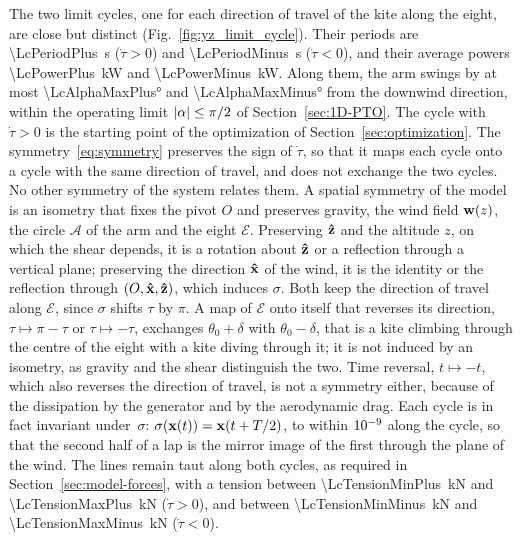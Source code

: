 The two limit cycles, one for each direction of travel of the kite along the eight, are close but distinct (Fig.~\ref{fig:yz_limit_cycle}).
Their periods are \SI{\LcPeriodPlus}{\second} (\(\dot\tau > 0\)) and \SI{\LcPeriodMinus}{\second} (\(\dot\tau < 0\)), and their average powers \SI{\LcPowerPlus}{\kilo\watt} and \SI{\LcPowerMinus}{\kilo\watt}.
Along them, the arm swings by at most \ang{\LcAlphaMaxPlus} and \ang{\LcAlphaMaxMinus} from the downwind direction, within the operating limit \(\abs{\alpha} \leq \pi/2\) of Section~\ref{sec:1D-PTO}.
The cycle with \(\dot\tau > 0\) is the starting point of the optimization of Section~\ref{sec:optimization}.
The symmetry~\eqref{eq:symmetry} preserves the sign of \(\dot\tau\), so that it maps each cycle onto a cycle with the same direction of travel, and does not exchange the two cycles.
No other symmetry of the system relates them.
A spatial symmetry of the model is an isometry that fixes the pivot \(O\) and preserves gravity, the wind field \(\vb w(z)\), the circle \(\mathscr{A}\) of the arm and the eight \(\mathscr{E}\).
Preserving \(\vu z\) and the altitude \(z\), on which the shear depends, it is a rotation about \(\vu z\) or a reflection through a vertical plane; preserving the direction \(\vu x\) of the wind, it is the identity or the reflection through \((O,\vu x,\vu z)\), which induces \(\sigma\).
Both keep the direction of travel along \(\mathscr{E}\), since \(\sigma\) shifts \(\tau\) by \(\pi\).
A map of \(\mathscr{E}\) onto itself that reverses its direction, \(\tau\mapsto\pi-\tau\) or \(\tau\mapsto-\tau\), exchanges \(\theta_0+\delta\) with \(\theta_0-\delta\), that is a kite climbing through the centre of the eight with a kite diving through it; it is not induced by an isometry, as gravity and the shear distinguish the two.
Time reversal, \(t\mapsto-t\), which also reverses the direction of travel, is not a symmetry either, because of the dissipation by the generator and by the aerodynamic drag.
Each cycle is in fact invariant under~\(\sigma\): \(\sigma(\vb x(t)) = \vb x(t + T/2)\), to within \(10^{-9}\) along the cycle, so that the second half of a lap is the mirror image of the first through the plane of the wind.
The lines remain taut along both cycles, as required in Section~\ref{sec:model-forces}, with a tension between \SI{\LcTensionMinPlus}{\kilo\newton} and \SI{\LcTensionMaxPlus}{\kilo\newton} (\(\dot\tau > 0\)), and between \SI{\LcTensionMinMinus}{\kilo\newton} and \SI{\LcTensionMaxMinus}{\kilo\newton} (\(\dot\tau < 0\)).
